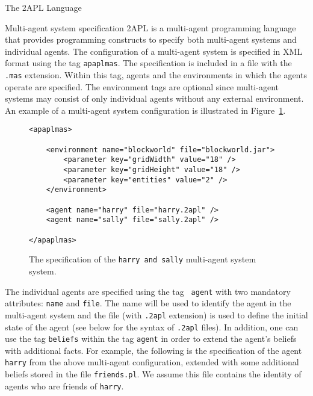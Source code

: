\renewcommand{\rule}[1]{$\langle #1\rangle$}

\begin{chapter}{The 2APL Language}\label{chap:language}

    \begin{section}{Multi-agent system specification}
        2APL is a multi-agent programming language that provides programming
        constructs to specify both multi-agent systems and individual
        agents. The configuration of a multi-agent system is specified in XML
        format using the tag {\tt apaplmas}. The specification is
        included in a file with the {\tt .mas} extension.
        Within this tag, agents and the environments in which the agents operate are
        specified. The environment tags are optional since multi-agent systems
        may consist of only individual agents without any external
        environment. An example of a multi-agent system
        configuration is illustrated in Figure~\ref{fig:masfile}.

\begin{figure}[ht]
\begin{verbatim}
<apaplmas>

    <environment name="blockworld" file="blockworld.jar">
        <parameter key="gridWidth" value="18" />
        <parameter key="gridHeight" value="18" />
        <parameter key="entities" value="2" />
    </environment>

    <agent name="harry" file="harry.2apl" />
    <agent name="sally" file="sally.2apl" />

</apaplmas>
\end{verbatim}
\caption{The specification of the {\tt harry and sally} multi-agent
system system.}\label{fig:masfile}
\end{figure}

        The individual agents are specified using the tag {\tt
        agent} with two mandatory attributes: {\tt name} and
        {\tt file}. The name will be used to identify the agent in the multi-agent system and the
        file (with {\tt .2apl} extension) is used to define the
        initial state of the agent (see below for the syntax of {\tt .2apl} files).
        In addition, one can use the tag {\tt beliefs} within the
        tag {\tt agent} in order to extend the agent's beliefs with additional facts.
        For example, the following is the specification of the agent {\tt harry} from the
        above multi-agent configuration, extended with some additional
        beliefs stored in the file {\tt friends.pl}. We assume this
        file contains the identity of agents who are friends of {\tt harry}.


\end{section}
\end{chapter}
